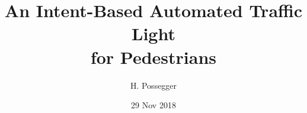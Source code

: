 \documentclass{beamer}
\title{An Intent-Based Automated Traffic Light\\for Pedestrians}
\author[Horst]{H. Possegger}
\date{29 Nov 2018}
\begin{document}
\begin{frame}
\titlepage
\end{frame}

\renewcommand{\colorslidenumberbg}{clrsblue}







\end{document}
